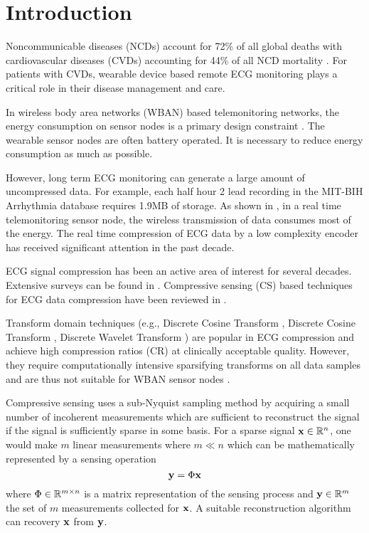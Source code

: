 \section{Introduction}
\label{sec:intro}
Noncommunicable diseases (NCDs) account for 72\%
of all global deaths with cardiovascular diseases
(CVDs) accounting for 44\% of all NCD mortality
\cite{collins2019interact}.
For patients with CVDs, wearable device based remote ECG
monitoring plays a critical role in their disease
management and care. 

In wireless body area networks (WBAN)
based telemonitoring networks\cite{cao2009enabling},
the energy consumption on sensor nodes is
a primary design constraint \cite{milenkovic2006wireless}.
The wearable sensor nodes are often battery operated.
It is necessary to reduce energy consumption as
much as possible.

However, long term ECG monitoring
can generate a large amount of uncompressed data.
For example, each half hour 2 lead recording in the
MIT-BIH Arrhythmia database \cite{moody2001impact}
requires 1.9MB of storage. As shown in \cite{mamaghanian2011compressed},
in a real time telemonitoring sensor node, the wireless
transmission of data consumes most of the energy.
The real time compression of ECG data by a low
complexity encoder has received significant attention
in the past decade.

ECG signal compression has been an active area
of interest for several decades. Extensive surveys
can be found in \cite{singh2015review,rajankar2019electrocardiogram}.
Compressive sensing (CS) based techniques for ECG
data compression have been reviewed in \cite{craven2014compressed,kumar2022review}.

Transform domain techniques
(e.g., Discrete Cosine Transform \cite{al1995dynamic},
Discrete Cosine Transform \cite{batista2001compression,bendifallah2011improved},
Discrete Wavelet Transform \cite{djohan1995ecg,lu2000wavelet,pooyan2004wavelet,kim2006wavelet}) are popular in ECG compression
and achieve high compression ratios (CR) at clinically
acceptable quality.
However, they require computationally intensive sparsifying
transforms on all data samples and are thus not suitable
for WBAN sensor nodes \cite{craven2014compressed}.

Compressive sensing \cite{donoho2006compressed,baraniuk2007compressive,
candes2006compressive, candes2008introduction, candes2006near}
uses a sub-Nyquist sampling method by acquiring a small number
of incoherent measurements which are sufficient to reconstruct
the signal if the signal is sufficiently sparse in some
basis. For a sparse signal $\mathbf{x} \in \mathbb{R}^n$, one would make
$m$ linear measurements where $m \ll n$ which can be
mathematically represented by a sensing operation
\begin{equation}
\mathbf{y} = \Phi \mathbf{x}
\end{equation}
where $\Phi \in \mathbb{R}^{m \times n}$ is a matrix
representation of the sensing process and $\mathbf{y} \in \mathbb{R}^m$
the set of $m$ measurements collected for $\mathbf{x}$.
A suitable reconstruction algorithm can recovery $\mathbf{x}$
from $\mathbf{y}$.

